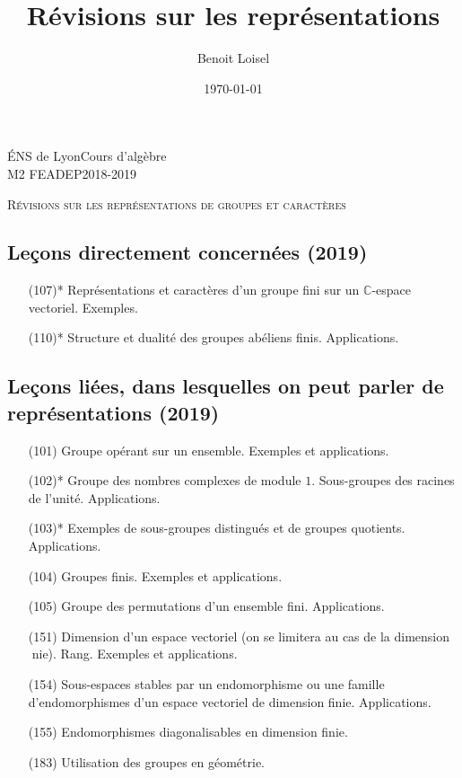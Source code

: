 \documentclass[a4paper]{article}
\title{Révisions sur les représentations} %
\author{Benoit Loisel} %
\date{\today}
\theoremstyle{definition} %
\theoremstyle{plain} %
\theoremstyle{remark} %
\begin{document}
\noindent \'ENS de Lyon\hfill Cours d'algèbre \\
M2 FEADEP\hfill 2018-2019\\


\begin{center}\Large\textsc{Révisions sur les représentations de groupes et caractères}\end{center}

\bigskip



\subsection*{Leçons directement concernées (2019)}

\begin{itemize}
\item[(107)*] Représentations et caractères d'un groupe fini sur un $\mathbb C$-espace vectoriel. Exemples.
\item[(110)*] Structure et dualité des groupes abéliens finis.  Applications.
\end{itemize}

\subsection*{Leçons liées, dans lesquelles on peut parler de représentations (2019)}

\begin{itemize}
\item[(101)] Groupe opérant sur un ensemble. Exemples et applications.
\item[(102)*] Groupe des nombres complexes de module $1$. Sous-groupes des racines de l'unité. Applications.
\item[(103)*] Exemples de sous-groupes distingués et de groupes quotients. Applications.
\item[(104)] Groupes finis. Exemples et applications.
\item[(105)] Groupe des permutations d'un ensemble fini. Applications.
\item[(151)] Dimension d'un espace vectoriel (on se limitera au cas de la dimension nie).
Rang. Exemples et applications.
\item[(154)] Sous-espaces stables par un endomorphisme ou une famille d'endomorphismes d'un espace vectoriel de dimension finie. Applications.
\item[(155)] Endomorphismes diagonalisables en dimension finie.
\item[(183)] Utilisation des groupes en géométrie.
\end{itemize}
\end{document}
